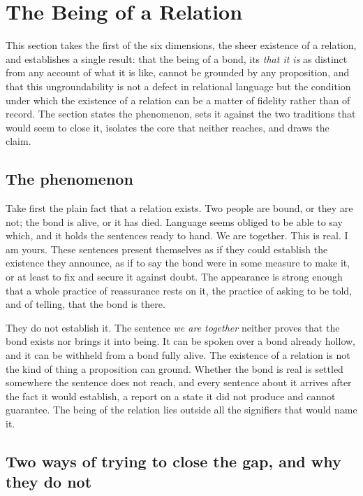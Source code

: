 \section{The Being of a Relation}
\label{p26:sec:existence}

\noindent
This section takes the first of the six dimensions, the sheer existence of a relation, and establishes a single result: that the being of a bond, its \emph{that it is} as distinct from any account of what it is like, cannot be grounded by any proposition, and that this ungroundability is not a defect in relational language but the condition under which the existence of a relation can be a matter of fidelity rather than of record. The section states the phenomenon, sets it against the two traditions that would seem to close it, isolates the core that neither reaches, and draws the claim.

\subsection*{The phenomenon}

Take first the plain fact that a relation exists. Two people are bound, or they are not; the bond is alive, or it has died. Language seems obliged to be able to say which, and it holds the sentences ready to hand. We are together. This is real. I am yours. These sentences present themselves as if they could establish the existence they announce, as if to say the bond were in some measure to make it, or at least to fix and secure it against doubt. The appearance is strong enough that a whole practice of reassurance rests on it, the practice of asking to be told, and of telling, that the bond is there.

They do not establish it. The sentence \emph{we are together} neither proves that the bond exists nor brings it into being. It can be spoken over a bond already hollow, and it can be withheld from a bond fully alive. The existence of a relation is not the kind of thing a proposition can ground. Whether the bond is real is settled somewhere the sentence does not reach, and every sentence about it arrives after the fact it would establish, a report on a state it did not produce and cannot guarantee. The being of the relation lies outside all the signifiers that would name it.

\subsection*{Two ways of trying to close the gap, and why they do not}


